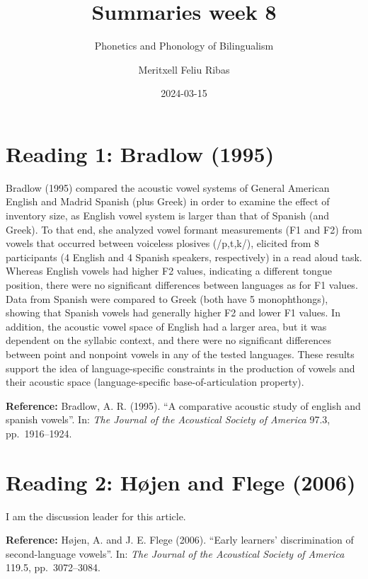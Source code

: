 \documentclass[
]{article}
\title{Summaries week 8}
\subtitle{Phonetics and Phonology of Bilingualism}
\author{Meritxell Feliu Ribas}
\date{2024-03-15}
\begin{document}
\maketitle

\hypertarget{reading-1-bradlow-1995}{%
\section{Reading 1: Bradlow (1995)}\label{reading-1-bradlow-1995}}

Bradlow (1995) compared the acoustic vowel systems of General American
English and Madrid Spanish (plus Greek) in order to examine the effect
of inventory size, as English vowel system is larger than that of
Spanish (and Greek). To that end, she analyzed vowel formant
measurements (F1 and F2) from vowels that occurred between voiceless
plosives (/p,t,k/), elicited from 8 participants (4 English and 4
Spanish speakers, respectively) in a read aloud task. Whereas English
vowels had higher F2 values, indicating a different tongue position,
there were no significant differences between languages as for F1
values. Data from Spanish were compared to Greek (both have 5
monophthongs), showing that Spanish vowels had generally higher F2 and
lower F1 values. In addition, the acoustic vowel space of English had a
larger area, but it was dependent on the syllabic context, and there
were no significant differences between point and nonpoint vowels in any
of the tested languages. These results support the idea of
language-specific constraints in the production of vowels and their
acoustic space (language-specific base-of-articulation property).

\textbf{Reference:} Bradlow, A. R. (1995). ``A comparative acoustic
study of english and spanish vowels''. In: \emph{The Journal of the
Acoustical Society of America} 97.3, pp.~1916--1924.

\hypertarget{reading-2-huxf8jen-and-flege-2006}{%
\section{Reading 2: Højen and Flege
(2006)}\label{reading-2-huxf8jen-and-flege-2006}}

I am the discussion leader for this article.

\textbf{Reference:} Højen, A. and J. E. Flege (2006). ``Early learners'
discrimination of second-language vowels''. In: \emph{The Journal of the
Acoustical Society of America} 119.5, pp.~3072--3084.
\end{document}
